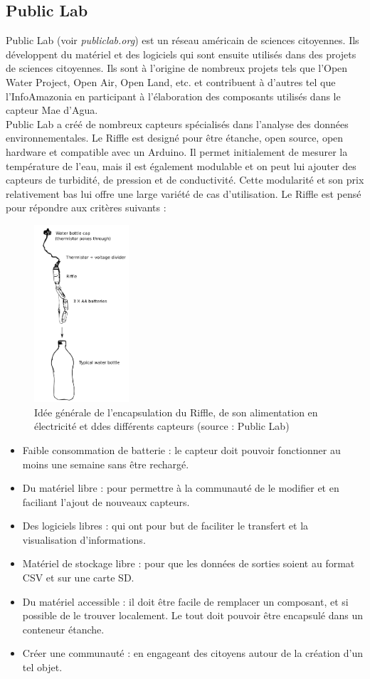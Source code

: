 \documentclass[10pt, article]{llncs}
\begin{document}
	\subsection{Public Lab}
		Public Lab (voir \textit{publiclab.org}) est un réseau américain de sciences citoyennes. Ils développent du matériel et des logiciels qui sont ensuite utilisés dans des projets de sciences citoyennes. Ils sont à l'origine de nombreux projets tels que l'Open Water Project, Open Air, Open Land, etc. et contribuent à d'autres tel que l'InfoAmazonia en participant à l'élaboration des composants utilisés dans le capteur Mae d'Agua.\\
		Public Lab a créé de nombreux capteurs spécialisés dans l'analyse des données environnementales. Le Riffle est designé pour être étanche, open source, open hardware et compatible avec un Arduino. Il permet initialement de mesurer la température de l'eau, mais il est également modulable et on peut lui ajouter des capteurs de turbidité, de pression et de conductivité. Cette modularité et son prix relativement bas lui offre une large variété de cas d'utilisation. Le Riffle est pensé pour répondre aux critères suivants :
		\begin{figure}
			\begin{center}
				\includegraphics[width=100pt]{img/bottle_enclosure.png}
			\end{center}
			\caption{Idée générale de l'encapsulation du Riffle, de son alimentation en électricité et ddes différents capteurs (source : Public Lab)}
		\end{figure}
		\begin{itemize}
			\item Faible consommation de batterie : le capteur doit pouvoir fonctionner au moins une semaine sans être rechargé.
			\item Du matériel libre : pour permettre à la communauté de le modifier et en faciliant l'ajout de nouveaux capteurs.
			\item Des logiciels libres : qui ont pour but de faciliter le transfert et la visualisation d'informations.
			\item Matériel de stockage libre : pour que les données de sorties soient au format CSV et sur une carte SD.
			\item Du matériel accessible : il doit être facile de remplacer un composant, et si possible de le trouver localement. Le tout doit pouvoir être encapsulé dans un conteneur étanche.
			\item Créer une communauté : en engageant des citoyens autour de la création d'un tel objet.
		\end{itemize}
\end{document}
